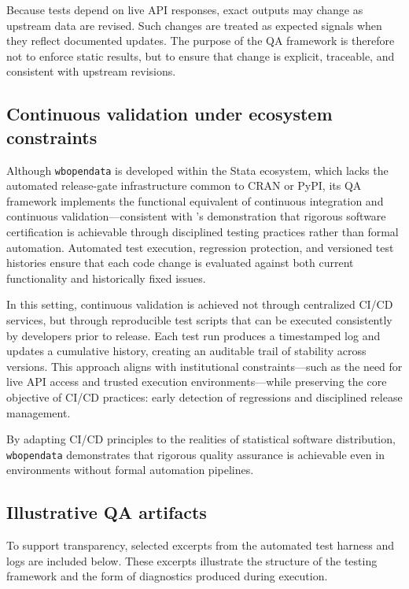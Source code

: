 \documentclass[bib]{statapress}
\begin{document}
Because tests depend on live API responses, exact outputs may change as upstream
data are revised. Such changes are treated as expected signals when they reflect
documented updates. The purpose of the QA framework is therefore not to enforce
static results, but to ensure that change is explicit, traceable, and consistent
with upstream revisions.

\subsection{Continuous validation under ecosystem constraints}

Although \texttt{wbopendata} is developed within the Stata ecosystem, which
lacks the automated release-gate infrastructure common to CRAN or PyPI, its QA
framework implements the functional equivalent of continuous integration and
continuous validation---consistent with \citeauthor{gould2001certification}'s
demonstration that rigorous software certification is achievable through
disciplined testing practices rather than formal automation. Automated test execution, regression protection, and
versioned test histories ensure that each code change is evaluated against both
current functionality and historically fixed issues.

In this setting, continuous validation is achieved not through centralized
CI/CD services, but through reproducible test scripts that can be executed
consistently by developers prior to release. Each test run produces a
timestamped log and updates a cumulative history, creating an auditable trail
of stability across versions. This approach aligns with institutional
constraints—such as the need for live API access and trusted execution
environments—while preserving the core objective of CI/CD practices: early
detection of regressions and disciplined release management.

By adapting CI/CD principles to the realities of statistical software
distribution, \texttt{wbopendata} demonstrates that rigorous quality assurance
is achievable even in environments without formal automation pipelines.

\subsection{Illustrative QA artifacts}

To support transparency, selected excerpts from the automated test harness and
logs are included below. These excerpts illustrate the structure of the testing
framework and the form of diagnostics produced during execution.
\end{document}
